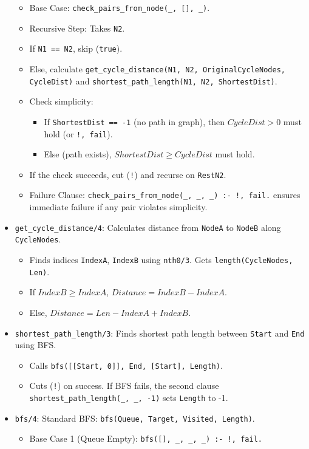 \documentclass[12pt,a4paper]{article}
\begin{document}
\begin{itemize}
\begin{itemize}
\item Base Case: \texttt{check\_pairs\_from\_node(\_, [], \_)}.
\item Recursive Step: Takes \texttt{N2}.
\item If \texttt{N1 == N2}, skip (\texttt{true}).
\item Else, calculate \texttt{get\_cycle\_distance(N1, N2, OriginalCycleNodes, CycleDist)} and \texttt{shortest\_path\_length(N1, N2, ShortestDist)}.
\item Check simplicity:
\begin{itemize}
\item If \texttt{ShortestDist == -1} (no path in graph), then $CycleDist > 0$ 
 must hold (or \texttt{!, fail}).
\item Else (path exists), $ShortestDist \ge CycleDist$ 
 must hold.
\end{itemize}
\item If the check succeeds, cut (\texttt{!}) and recurse on \texttt{RestN2}.
\item Failure Clause: \texttt{check\_pairs\_from\_node(\_, \_, \_) :- !, fail.} ensures immediate failure if any pair violates simplicity.
\end{itemize}
\item \texttt{get\_cycle\_distance/4}: Calculates distance from \texttt{NodeA} to \texttt{NodeB} along \texttt{CycleNodes}.
\begin{itemize}
\item Finds indices \texttt{IndexA}, \texttt{IndexB} using \texttt{nth0/3}. Gets \texttt{length(CycleNodes, Len)}.
\item If $IndexB \ge IndexA$, $Distance = IndexB - IndexA$. 
\item Else, $Distance = Len - IndexA + IndexB$. 
\end{itemize}
\item \texttt{shortest\_path\_length/3}: Finds shortest path length between \texttt{Start} and \texttt{End} using BFS.
\begin{itemize}
\item Calls \texttt{bfs([[Start, 0]], End, [Start], Length)}.
\item Cuts (\texttt{!}) on success. If BFS fails, the second clause \texttt{shortest\_path\_length(\_, \_, -1)} sets \texttt{Length} to -1.
\end{itemize}
\item \texttt{bfs/4}: Standard BFS: \texttt{bfs(Queue, Target, Visited, Length)}.
\begin{itemize}
\item Base Case 1 (Queue Empty): \texttt{bfs([], \_, \_, \_) :- !, fail.}

\end{itemize}
\end{itemize}
\end{document}
